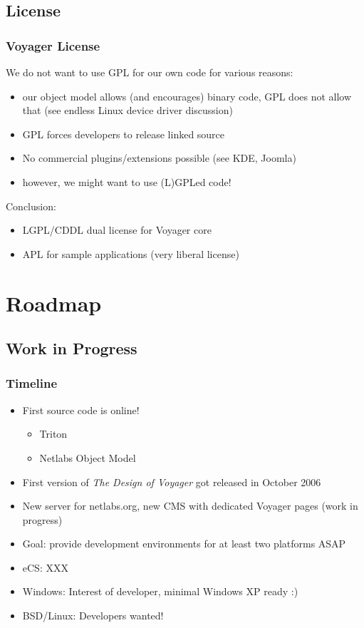 \documentclass{beamer}
\begin{document}
\subsection{License}

\begin{frame}[allowframebreaks=0.6]
\frametitle{Voyager License}
We do not want to use GPL for our own code for various reasons:
\begin{itemize}[<+->]
  \item our object model allows (and encourages) binary code, GPL does not allow
  that (see endless Linux device driver discussion)
  \item GPL forces developers to release linked source
  \item No commercial plugins/extensions possible (see KDE, Joomla)
  \item however, we might want to use (L)GPLed code!
\end{itemize}
Conclusion:
\begin{itemize}[<+->]
  \item LGPL/CDDL dual license for Voyager core
  \item APL for sample applications (very liberal license)
\end{itemize}
\end{frame}

\section{Roadmap}
\subsection{Work in Progress}

\begin{frame}[allowframebreaks=0.6]
\frametitle{Timeline}
\begin{itemize}[<+->]
  \item First source code is online!
  \begin{itemize}[<+->]
    \item Triton
    \item Netlabs Object Model
  \end{itemize}
  \item First version of \textit{The Design of Voyager} got released in October 2006
  \item New server for netlabs.org, new CMS with dedicated Voyager pages (work in progress)
  \item Goal: provide development environments for at least two platforms ASAP
  \item eCS: XXX
  \item Windows: Interest of developer, minimal Windows XP ready :)
  \item BSD/Linux: Developers wanted!
\end{itemize}
\end{frame}
\end{document}
